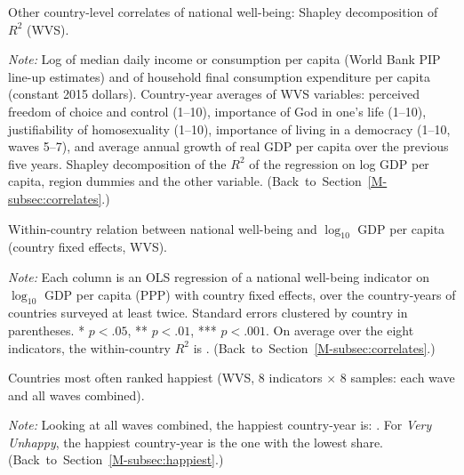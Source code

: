 \documentclass[12pt]{article}
\begin{document}
\begin{table}[htbp]
    \centering
    \begin{adjustbox}{max width=\textwidth}
    
    \end{adjustbox}
    \caption{Other country-level correlates of national well-being: Shapley decomposition of $R^2$ (WVS).}\label{tab:correlates}
    \begin{minipage}{\textwidth}\footnotesize \textit{Note:} Log of median daily income or consumption per capita (World Bank PIP line-up estimates) and of household final consumption expenditure per capita (constant 2015 dollars). Country-year averages of WVS variables: perceived freedom of choice and control (1--10), importance of God in one's life (1--10), justifiability of homosexuality (1--10), importance of living in a democracy (1--10, waves 5--7), and average annual growth of real GDP per capita over the previous five years. Shapley decomposition of the $R^2$ of the regression on log GDP per capita, region dummies and the other variable. \hfill(Back~to~Section~\ref{M-subsec:correlates}.)\end{minipage}
\end{table}

\begin{table}[htbp]
    \centering
    \begin{adjustbox}{max width=\textwidth}
    
    \end{adjustbox}
    \caption{Within-country relation between national well-being and $\log_{10}$ GDP per capita (country fixed effects, WVS).}\label{tab:within}
    \begin{minipage}{\textwidth}\footnotesize \textit{Note:} Each column is an OLS regression of a national well-being indicator on $\log_{10}$ GDP per capita (PPP) with country fixed effects, over the country-years of countries surveyed at least twice. Standard errors clustered by country in parentheses. * $p<.05$, ** $p<.01$, *** $p<.001$. On average over the eight indicators, the within-country $R^2$ is \meanWithinRtwo. \hfill(Back~to~Section~\ref{M-subsec:correlates}.)\end{minipage}
\end{table}

\begin{table}[htbp]
    \centering
    
    \caption{Countries most often ranked happiest (WVS, 8 indicators $\times$ 8 samples: each wave and all waves combined).}\label{tab:happiest}
    \begin{minipage}{\textwidth}\footnotesize \textit{Note:} Looking at all waves combined, the happiest country-year is: \happiestAllWaves. For \textit{Very Unhappy}, the happiest country-year is the one with the lowest share. \hfill(Back~to~Section~\ref{M-subsec:happiest}.)\end{minipage}
\end{table}
\end{document}
